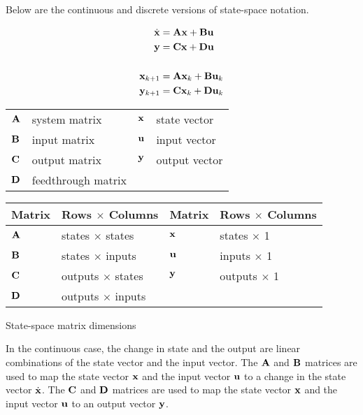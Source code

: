 Below are the continuous and discrete versions of state-space notation.

\begin{definition}%

  \begin{align}
    \dot{\mathbf{x}} &= \mathbf{A}\mathbf{x} + \mathbf{B}\mathbf{u} \label{eq:ss_ctrl_x} \\
    \mathbf{y} &= \mathbf{C}\mathbf{x} + \mathbf{D}\mathbf{u} \label{eq:ss_ctrl_y} \\
    \nonumber \\
    \mathbf{x}_{k+1} &= \mathbf{A}\mathbf{x}_k + \mathbf{B}\mathbf{u}_k \label{eq:ssz_ctrl_x} \\
    \mathbf{y}_{k+1} &= \mathbf{C}\mathbf{x}_k + \mathbf{D}\mathbf{u}_k \label{eq:ssz_ctrl_y}
  \end{align}

  \begin{figurekey}
    \begin{tabulary}{\linewidth}{LLLL}
      $\mathbf{A}$ & system matrix      & $\mathbf{x}$ & state vector \\
      $\mathbf{B}$ & input matrix       & $\mathbf{u}$ & input vector \\
      $\mathbf{C}$ & output matrix      & $\mathbf{y}$ & output vector \\
      $\mathbf{D}$ & feedthrough matrix &  &  \\
    \end{tabulary}
  \end{figurekey}
\end{definition}

\begin{booktable}
  \begin{tabular}{|ll|ll|}
    \hline
    \rowcolor{headingbg}
    \textbf{Matrix} & \textbf{Rows $\times$ Columns} &
    \textbf{Matrix} & \textbf{Rows $\times$ Columns} \\
    \hline
    $\mathbf{A}$ & states $\times$ states & $\mathbf{x}$ & states $\times$ 1 \\
    $\mathbf{B}$ & states $\times$ inputs & $\mathbf{u}$ & inputs $\times$ 1 \\
    $\mathbf{C}$ & outputs $\times$ states & $\mathbf{y}$ & outputs $\times$ 1 \\
    $\mathbf{D}$ & outputs $\times$ inputs &  &  \\
    \hline
  \end{tabular}
  \caption{State-space matrix dimensions}
  \label{tab:ss_matrix_dims}
\end{booktable}

In the continuous case, the change in \gls{state} and the \gls{output} are
linear combinations of the \gls{state} vector and the \gls{input} vector. The
$\mathbf{A}$ and $\mathbf{B}$ matrices are used to map the \gls{state} vector
$\mathbf{x}$ and the \gls{input} vector $\mathbf{u}$ to a change in the \gls{state}
vector $\dot{\mathbf{x}}$. The $\mathbf{C}$ and $\mathbf{D}$ matrices are used to map the
\gls{state} vector $\mathbf{x}$ and the \gls{input} vector $\mathbf{u}$ to an
\gls{output} vector $\mathbf{y}$.
